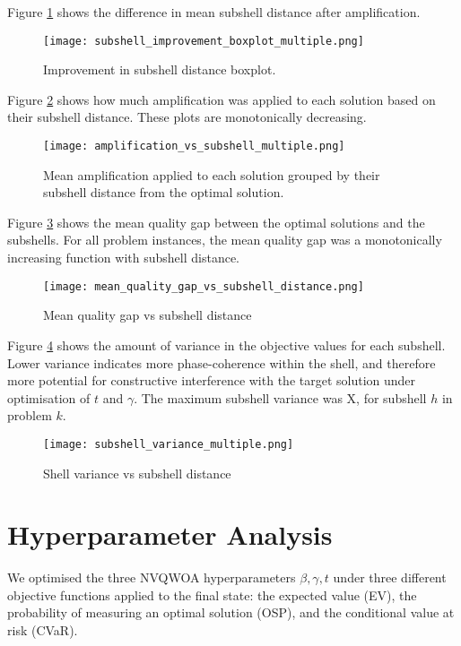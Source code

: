 Figure \ref{fig:sub improvement} shows the difference in mean subshell distance after amplification.
\begin{figure}[htbp]
    \centering
    \texttt{[image: subshell\_improvement\_boxplot\_multiple.png]}
    \caption{Improvement in subshell distance boxplot.}
    \label{fig:sub improvement}
\end{figure}

Figure \ref{fig:amp vs sub} shows how much amplification was applied to each solution based on their subshell distance. These plots are monotonically decreasing. 
\begin{figure}[htbp]
    \centering
    \texttt{[image: amplification\_vs\_subshell\_multiple.png]}
    \caption{Mean amplification applied to each solution grouped by their subshell distance from the optimal solution.}
    \label{fig:amp vs sub}
\end{figure}

Figure \ref{fig:mqg} shows the mean quality gap between the optimal solutions and the subshells. For all problem instances, the mean quality gap was a monotonically increasing function with subshell distance.
\begin{figure}[htbp]
    \centering
    \texttt{[image: mean\_quality\_gap\_vs\_subshell\_distance.png]}
    \caption{Mean quality gap vs subshell distance}
    \label{fig:mqg}
\end{figure}

Figure \ref{fig:shell variance} shows the amount of variance in the objective values for each subshell.
Lower variance indicates more phase-coherence within the shell, and therefore more potential for constructive interference with the target solution under optimisation of $t$ and $\gamma$. The maximum subshell variance was X, for subshell $h$ in problem $k$.
\begin{figure}[htbp]
    \centering
    \texttt{[image: subshell\_variance\_multiple.png]}
    \caption{Shell variance vs subshell distance}
    \label{fig:shell variance}
\end{figure}

\section{Hyperparameter Analysis}
We optimised the three NVQWOA hyperparameters $\beta, \gamma, t$ under three different objective functions applied to the final state: the expected value (EV), the probability of measuring an optimal solution (OSP), and the conditional value at risk (CVaR).

